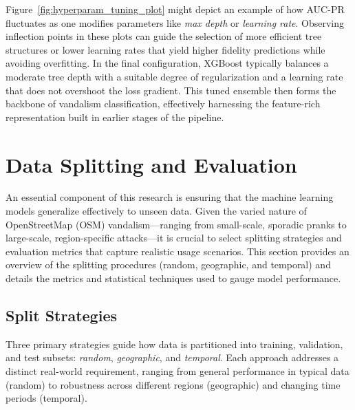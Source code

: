 \documentclass[
    13pt, %
    a4paper, %
    twoside, 
    DIV14, %
    listof=totoc, %
    bibliography=totoc, %
    index=totoc, %
    headsepline
]{scrreprt}
\begin{document}
Figure~\ref{fig:hyperparam_tuning_plot} might depict an example of how AUC-PR fluctuates as one modifies parameters like \emph{max depth} or \emph{learning rate}. Observing inflection points in these plots can guide the selection of more efficient tree structures or lower learning rates that yield higher fidelity predictions while avoiding overfitting. In the final configuration, XGBoost typically balances a moderate tree depth with a suitable degree of regularization and a learning rate that does not overshoot the loss gradient. This tuned ensemble then forms the backbone of vandalism classification, effectively harnessing the feature-rich representation built in earlier stages of the pipeline.

\section{Data Splitting and Evaluation}
\label{sec:data_splitting_evaluation}

An essential component of this research is ensuring that the machine learning models generalize effectively to unseen data. Given the varied nature of OpenStreetMap (OSM) vandalism—ranging from small-scale, sporadic pranks to large-scale, region-specific attacks—it is crucial to select splitting strategies and evaluation metrics that capture realistic usage scenarios. This section provides an overview of the splitting procedures (random, geographic, and temporal) and details the metrics and statistical techniques used to gauge model performance.

\subsection{Split Strategies}
\label{sec:split_strategies}

Three primary strategies guide how data is partitioned into training, validation, and test subsets: \emph{random}, \emph{geographic}, and \emph{temporal}. Each approach addresses a distinct real-world requirement, ranging from general performance in typical data (random) to robustness across different regions (geographic) and changing time periods (temporal).
\end{document}
